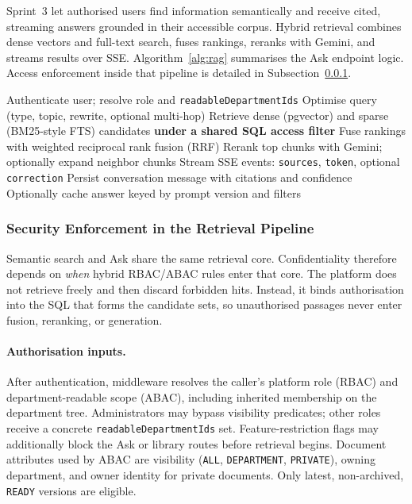 Sprint~3 let authorised users find information semantically and receive cited,
streaming answers grounded in their accessible corpus. Hybrid retrieval combines
dense vectors and full-text search, fuses rankings, reranks with Gemini, and
streams results over SSE. Algorithm~\ref{alg:rag} summarises the Ask endpoint
logic. Access enforcement inside that pipeline is detailed in
Subsection~\ref{subsubsec:retrieval-security}.

\begin{algorithm}[H]
\caption{Hybrid RAG Ask pipeline (simplified)}
\label{alg:rag}
\begin{algorithmic}[1]
\State Authenticate user; resolve role and \texttt{readableDepartmentIds}
\State Optimise query (type, topic, rewrite, optional multi-hop)
\State Retrieve dense (pgvector) and sparse (BM25-style FTS) candidates
      \textbf{under a shared SQL access filter}
\State Fuse rankings with weighted reciprocal rank fusion (RRF)
\State Rerank top chunks with Gemini; optionally expand neighbor chunks
\State Stream SSE events: \texttt{sources}, \texttt{token}, optional \texttt{correction}
\State Persist conversation message with citations and confidence
\State Optionally cache answer keyed by prompt version and filters
\end{algorithmic}
\end{algorithm}

\subsubsection{Security Enforcement in the Retrieval Pipeline}
\label{subsubsec:retrieval-security}

Semantic search and Ask share the same retrieval core. Confidentiality therefore
depends on \emph{when} hybrid RBAC/ABAC rules enter that core. The platform does
not retrieve freely and then discard forbidden hits. Instead, it binds
authorisation into the SQL that forms the candidate sets, so unauthorised
passages never enter fusion, reranking, or generation.

\paragraph{Authorisation inputs.}
After authentication, middleware resolves the caller's platform role (RBAC) and
department-readable scope (ABAC), including inherited membership on the
department tree. Administrators may bypass visibility predicates; other roles
receive a concrete \texttt{readableDepartmentIds} set. Feature-restriction flags
may additionally block the Ask or library routes before retrieval begins.
Document attributes used by ABAC are visibility
(\texttt{ALL}, \texttt{DEPARTMENT}, \texttt{PRIVATE}), owning department, and
owner identity for private documents. Only latest, non-archived,
\texttt{READY} versions are eligible.

